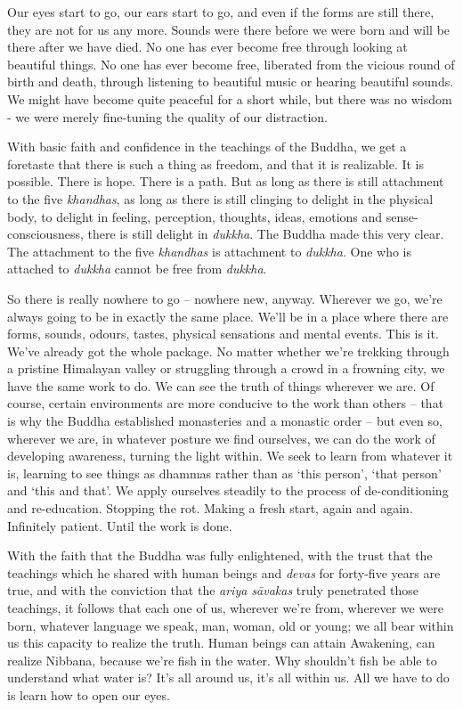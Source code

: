 Our eyes start to go, our ears start to go, and even if the forms are
still there, they are not for us any more. Sounds were there before we
were born and will be there after we have died. No one has ever become
free through looking at beautiful things. No one has ever become free,
liberated from the vicious round of birth and death, through listening
to beautiful music or hearing beautiful sounds. We might have become
quite peaceful for a short while, but there was no wisdom - we were
merely fine-tuning the quality of our distraction.

With basic faith and confidence in the teachings of the Buddha, we get a
foretaste that there is such a thing as freedom, and that it is
realizable. It is possible. There is hope. There is a path. But as long
as there is still attachment to the five \emph{khandhas}, as long as
there is still clinging to delight in the physical body, to delight in
feeling, perception, thoughts, ideas, emotions and sense-consciousness,
there is still delight in \emph{dukkha}. The Buddha made this very
clear. The attachment to the five \emph{khandhas} is attachment to
\emph{dukkha}. One who is attached to \emph{dukkha} cannot be free from
\emph{dukkha}.

So there is really nowhere to go -- nowhere new, anyway. Wherever we
go, we're always going to be in exactly the same place. We'll be in a
place where there are forms, sounds, odours, tastes, physical sensations
and mental events. This is it. We've already got the whole package. No
matter whether we're trekking through a pristine Himalayan valley or
struggling through a crowd in a frowning city, we have the same work to
do. We can see the truth of things wherever we are. Of course, certain
environments are more conducive to the work than others -- that is why
the Buddha established monasteries and a monastic order -- but even so,
wherever we are, in whatever posture we find ourselves, we can do the
work of developing awareness, turning the light within. We seek to learn
from whatever it is, learning to see things as dhammas rather than as
`this person', `that person' and `this and that'. We apply ourselves
steadily to the process of de-conditioning and re-education. Stopping
the rot. Making a fresh start, again and again. Infinitely patient.
Until the work is done.

With the faith that the Buddha was fully enlightened, with the trust
that the teachings which he shared with human beings and \emph{devas}
for forty-five years are true, and with the conviction that the
\emph{ariya sāvakas} truly penetrated those teachings, it follows that
each one of us, wherever we're from, wherever we were born, whatever
language we speak, man, woman, old or young; we all bear within us this
capacity to realize the truth. Human beings can attain Awakening, can
realize Nibbana, because we're fish in the water. Why shouldn't fish be
able to understand what water is? It's all around us, it's all within
us. All we have to do is learn how to open our eyes.

